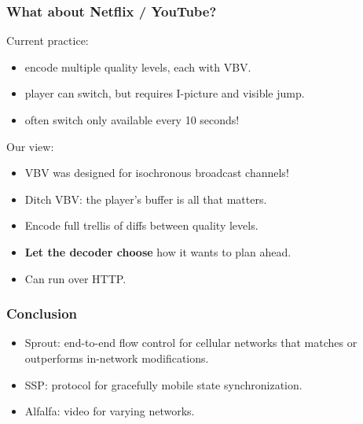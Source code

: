 \documentclass[svgnames]{beamer}
\begin{document}
\begin{frame}
\frametitle{What about Netflix / YouTube?}

Current practice:

\begin{itemize}
\item encode multiple quality levels, each with VBV.

\item player can switch, but requires I-picture and visible jump.

\item often switch only available every 10 seconds!
\end{itemize}

Our view:

\begin{itemize}
\item VBV was designed for isochronous broadcast channels!

\item Ditch VBV: the player's buffer is all that matters.

\item Encode full trellis of diffs between quality levels.

\item \textbf{Let the decoder choose} how it wants to plan ahead.

\item Can run over HTTP.
\end{itemize}

\end{frame}

\begin{frame}
\frametitle{Conclusion}

\begin{itemize}

\item Sprout: end-to-end flow control for cellular networks that
  matches or outperforms in-network modifications.

\item SSP: protocol for gracefully mobile state synchronization.

\item Alfalfa: video for varying networks.

\end{itemize}

\end{frame}
\end{document}

